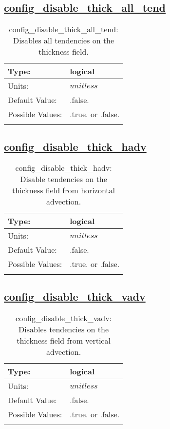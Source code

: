 \subsection[config\_disable\_thick\_all\_tend]{\hyperref[sec:nm_tab_debug]{config\_disable\_thick\_all\_tend}}
\label{subsec:nm_sec_config_disable_thick_all_tend}
\begin{center}
\begin{longtable}{| p{2.0in} | p{4.0in} |}
    \hline
    Type: & logical \\
    \hline
    Units: & $unitless$ \\
    \hline
    Default Value: & .false. \\
    \hline
    Possible Values: & .true. or .false. \\
    \hline
    \caption{config\_disable\_thick\_all\_tend: Disables all tendencies on the thickness field.}
\end{longtable}
\end{center}
\subsection[config\_disable\_thick\_hadv]{\hyperref[sec:nm_tab_debug]{config\_disable\_thick\_hadv}}
\label{subsec:nm_sec_config_disable_thick_hadv}
\begin{center}
\begin{longtable}{| p{2.0in} | p{4.0in} |}
    \hline
    Type: & logical \\
    \hline
    Units: & $unitless$ \\
    \hline
    Default Value: & .false. \\
    \hline
    Possible Values: & .true. or .false. \\
    \hline
    \caption{config\_disable\_thick\_hadv: Disable tendencies on the thickness field from horizontal advection.}
\end{longtable}
\end{center}
\subsection[config\_disable\_thick\_vadv]{\hyperref[sec:nm_tab_debug]{config\_disable\_thick\_vadv}}
\label{subsec:nm_sec_config_disable_thick_vadv}
\begin{center}
\begin{longtable}{| p{2.0in} | p{4.0in} |}
    \hline
    Type: & logical \\
    \hline
    Units: & $unitless$ \\
    \hline
    Default Value: & .false. \\
    \hline
    Possible Values: & .true. or .false. \\
    \hline
    \caption{config\_disable\_thick\_vadv: Disables tendencies on the thickness field from vertical advection.}
\end{longtable}
\end{center}
